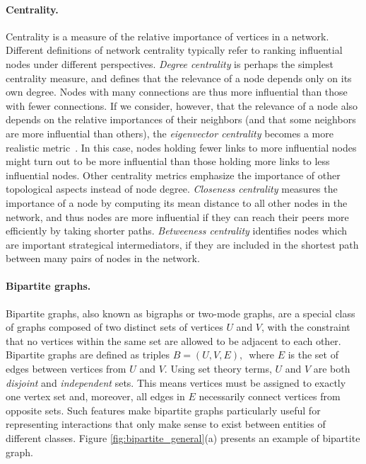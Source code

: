 \paragraph*{Centrality.}
Centrality is a measure of the relative importance of vertices in a network. 
Different definitions of network centrality typically refer to ranking influential nodes under different perspectives.
\textit{Degree centrality} is perhaps the simplest centrality measure, and defines that the relevance of a node depends only on its own degree. Nodes with many connections are thus more influential than those with fewer connections.
If we consider, however, that the relevance of a node also depends on the relative importances of their neighbors (and that some neighbors are more influential than others), the \textit{eigenvector centrality} becomes a more realistic metric~\cite{Bonacich1987}.
In this case, nodes holding fewer links to more influential nodes might turn out to be more influential than those holding more links to less influential nodes.
Other centrality metrics emphasize the importance of other topological aspects instead of node degree.
\textit{Closeness centrality} measures the importance of a node by computing its mean distance to all other nodes in the network, and thus nodes are more influential if they can reach their peers more efficiently by taking shorter paths.
\textit{Betweeness centrality} identifies nodes which are important strategical intermediators, if they are included in the shortest path between many pairs of nodes in the network.  

\paragraph*{Bipartite graphs.}
Bipartite graphs, also known as bigraphs or two-mode graphs, are a special class of graphs composed of two distinct sets of vertices $U$ and $V$, with the constraint that no vertices within the same set are allowed to be adjacent to each other. 
Bipartite graphs are defined as triples 
$
B = (U, V, E) \mbox{, }
$
where $E$ is the set of edges between vertices from $U$ and $V$.
Using set theory terms, $U$ and $V$ are both \textit{disjoint} and \textit{independent} sets.
This means vertices must be assigned to exactly one vertex set and, moreover, all edges in $E$ necessarily connect vertices from opposite sets. 
Such features make bipartite graphs particularly useful for representing interactions that only make sense to exist between entities of different classes. Figure \ref{fig:bipartite_general}(a) presents an example of bipartite graph.

